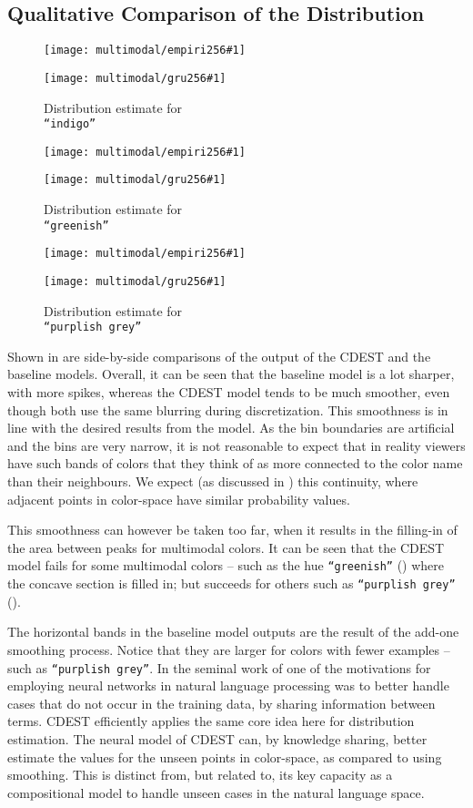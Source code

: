 \documentclass[11pt,a4paper]{article}
\newcommand{\textcite}{\citet}
\begin{document}
\subsection{Qualitative Comparison of the Distribution}\label{resultsdistributions}

\newcommand{\multimodalfig}[2]{
	\begin{figure}
		\texttt{[image: multimodal/empiri256\#1]}
		
		\vspace{3mm}
		
		\texttt{[image: multimodal/gru256\#1]}	
		\caption{\label{fig#1} Distribution estimate for \\ \mbox{\texttt{``#2''}}}
	\end{figure}
}

\multimodalfig{indigo}{indigo}
\multimodalfig{greenish}{greenish}
\multimodalfig{purplishgrey}{purplish grey}


Shown in  are side-by-side comparisons of the output of the CDEST and the baseline models.
Overall, it can be seen that the baseline model is a lot sharper, with more spikes,
whereas the CDEST model tends to be much smoother, even though both use the same blurring during discretization.
This smoothness is in line with the desired results from the model.
As the bin boundaries are artificial and the bins are very narrow, it is not reasonable to expect that in reality viewers have such bands of colors that they think of as more connected to the color name than their neighbours.
We expect  (as discussed in ) this continuity, where adjacent points in color-space have similar probability values.

This smoothness can however be taken too far, when it results in the filling-in of the area between peaks for multimodal colors.
It can be seen that the CDEST model fails for some multimodal colors -- such as the hue \texttt{``greenish''} () where the concave section is filled in;
but succeeds for others such as \texttt{``purplish grey''} ().


The horizontal bands in the baseline model outputs are the result of the add-one smoothing process.
Notice that they are larger for colors with fewer examples -- such as \texttt{``purplish grey''}.
In the seminal work of \textcite{NPLM} one of the motivations for employing neural networks in natural language processing was to better handle cases that do not occur in the training data, by sharing information between terms.
CDEST efficiently applies the same core idea here for distribution estimation.
The neural model of CDEST can, by knowledge sharing, better estimate the values for the unseen points in color-space, as compared to using smoothing.
This is distinct from, but related to, its key capacity as a compositional model to handle unseen cases in the natural language space. 
\end{document}
